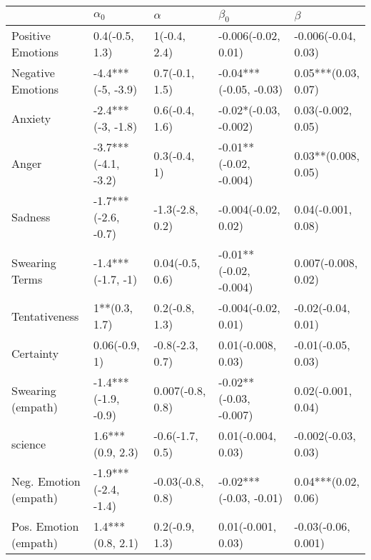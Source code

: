 \begin{tabular}{lllll}
\toprule
{} &           $\alpha_0$ &          $\alpha$ &               $\beta_0$ &              $\beta$ \\
\midrule
Positive Emotions     &       0.4(-0.5, 1.3) &      1(-0.4, 2.4) &     -0.006(-0.02, 0.01) &  -0.006(-0.04, 0.03) \\
Negative Emotions     &    -4.4***(-5, -3.9) &    0.7(-0.1, 1.5) &  -0.04***(-0.05, -0.03) &  0.05***(0.03, 0.07) \\
Anxiety               &    -2.4***(-3, -1.8) &    0.6(-0.4, 1.6) &   -0.02*(-0.03, -0.002) &   0.03(-0.002, 0.05) \\
Anger                 &  -3.7***(-4.1, -3.2) &      0.3(-0.4, 1) &  -0.01**(-0.02, -0.004) &  0.03**(0.008, 0.05) \\
Sadness               &  -1.7***(-2.6, -0.7) &   -1.3(-2.8, 0.2) &     -0.004(-0.02, 0.02) &   0.04(-0.001, 0.08) \\
Swearing Terms        &    -1.4***(-1.7, -1) &   0.04(-0.5, 0.6) &  -0.01**(-0.02, -0.004) &  0.007(-0.008, 0.02) \\
Tentativeness         &        1**(0.3, 1.7) &    0.2(-0.8, 1.3) &     -0.004(-0.02, 0.01) &   -0.02(-0.04, 0.01) \\
Certainty             &        0.06(-0.9, 1) &   -0.8(-2.3, 0.7) &      0.01(-0.008, 0.03) &   -0.01(-0.05, 0.03) \\
Swearing (empath)     &  -1.4***(-1.9, -0.9) &  0.007(-0.8, 0.8) &  -0.02**(-0.03, -0.007) &   0.02(-0.001, 0.04) \\
science               &     1.6***(0.9, 2.3) &   -0.6(-1.7, 0.5) &      0.01(-0.004, 0.03) &  -0.002(-0.03, 0.03) \\
Neg. Emotion (empath) &  -1.9***(-2.4, -1.4) &  -0.03(-0.8, 0.8) &  -0.02***(-0.03, -0.01) &  0.04***(0.02, 0.06) \\
Pos. Emotion (empath) &     1.4***(0.8, 2.1) &    0.2(-0.9, 1.3) &      0.01(-0.001, 0.03) &  -0.03(-0.06, 0.001) \\
\bottomrule
\end{tabular}
